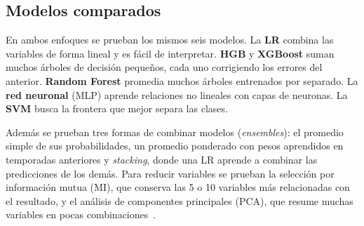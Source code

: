 \documentclass[conference]{IEEEtran}
\begin{document}
\subsection{Modelos comparados}
En ambos enfoques se prueban los mismos seis modelos. La \textbf{LR} combina las variables de forma lineal y es fácil de interpretar. \textbf{HGB} y \textbf{XGBoost} suman muchos árboles de decisión pequeños, cada uno corrigiendo los errores del anterior. \textbf{Random Forest} promedia muchos árboles entrenados por separado. La \textbf{red neuronal} (MLP) aprende relaciones no lineales con capas de neuronas. La \textbf{SVM} busca la frontera que mejor separa las clases.

Además se prueban tres formas de combinar modelos (\emph{ensembles}): el promedio simple de sus probabilidades, un promedio ponderado con pesos aprendidos en temporadas anteriores y \emph{stacking}, donde una LR aprende a combinar las predicciones de los demás. Para reducir variables se prueban la selección por información mutua (MI), que conserva las 5 o 10 variables más relacionadas con el resultado, y el análisis de componentes principales (PCA), que resume muchas variables en pocas combinaciones~\cite{tammouch2024,james2023}.
\end{document}

